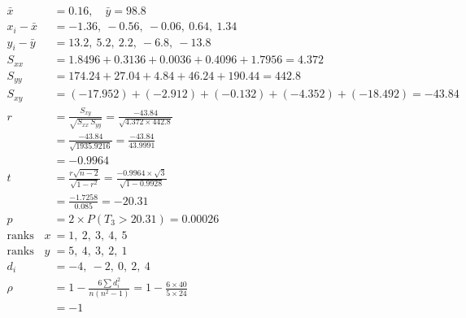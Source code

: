 \begin{align*}
\bar{x} &= 0.16, \quad \bar{y} = 98.8 \\
x_i - \bar{x} &= -1.36,\ -0.56,\ -0.06,\ 0.64,\ 1.34 \\
y_i - \bar{y} &= 13.2,\ 5.2,\ 2.2,\ -6.8,\ -13.8 \\
S_{xx} &= 1.8496 + 0.3136 + 0.0036 + 0.4096 + 1.7956 = 4.372 \\
S_{yy} &= 174.24 + 27.04 + 4.84 + 46.24 + 190.44 = 442.8 \\
S_{xy} &= (-17.952) + (-2.912) + (-0.132) + (-4.352) + (-18.492) = -43.84 \\
r &= \frac{S_{xy}}{\sqrt{S_{xx}\,S_{yy}}} = \frac{-43.84}{\sqrt{4.372 \times 442.8}} \\
 &= \frac{-43.84}{\sqrt{1935.9216}} = \frac{-43.84}{43.9991} \\
 &= -0.9964 \\
t &= \frac{r\sqrt{n - 2}}{\sqrt{1 - r^2}} = \frac{-0.9964 \times \sqrt{3}}{\sqrt{1 - 0.9928}} \\
 &= \frac{-1.7258}{0.085} = -20.31 \\
p &= 2 \times P(T_3 > 20.31) = 0.00026 \\
\text{ranks of } x &= 1,\ 2,\ 3,\ 4,\ 5 \\
\text{ranks of } y &= 5,\ 4,\ 3,\ 2,\ 1 \\
d_i &= -4,\ -2,\ 0,\ 2,\ 4 \\
\rho &= 1 - \frac{6\sum d_i^2}{n(n^2 - 1)} = 1 - \frac{6 \times 40}{5 \times 24} \\
 &= -1
\end{align*}
